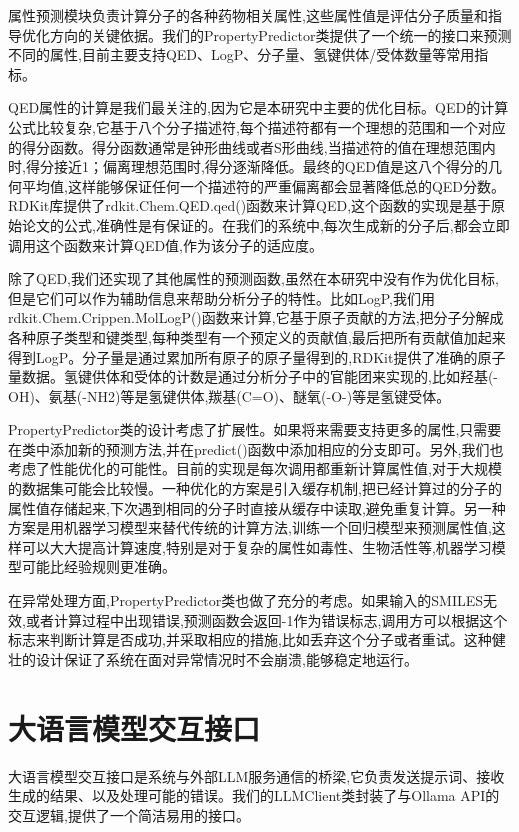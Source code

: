 属性预测模块负责计算分子的各种药物相关属性,这些属性值是评估分子质量和指导优化方向的关键依据。我们的PropertyPredictor类提供了一个统一的接口来预测不同的属性,目前主要支持QED、LogP、分子量、氢键供体/受体数量等常用指标。

QED属性的计算是我们最关注的,因为它是本研究中主要的优化目标。QED的计算公式比较复杂,它基于八个分子描述符,每个描述符都有一个理想的范围和一个对应的得分函数。得分函数通常是钟形曲线或者S形曲线,当描述符的值在理想范围内时,得分接近1；偏离理想范围时,得分逐渐降低。最终的QED值是这八个得分的几何平均值,这样能够保证任何一个描述符的严重偏离都会显著降低总的QED分数。RDKit库提供了rdkit.Chem.QED.qed()函数来计算QED,这个函数的实现是基于原始论文的公式,准确性是有保证的。在我们的系统中,每次生成新的分子后,都会立即调用这个函数来计算QED值,作为该分子的适应度。

除了QED,我们还实现了其他属性的预测函数,虽然在本研究中没有作为优化目标,但是它们可以作为辅助信息来帮助分析分子的特性。比如LogP,我们用rdkit.Chem.Crippen.MolLogP()函数来计算,它基于原子贡献的方法,把分子分解成各种原子类型和键类型,每种类型有一个预定义的贡献值,最后把所有贡献值加起来得到LogP。分子量是通过累加所有原子的原子量得到的,RDKit提供了准确的原子量数据。氢键供体和受体的计数是通过分析分子中的官能团来实现的,比如羟基(-OH)、氨基(-NH2)等是氢键供体,羰基(C=O)、醚氧(-O-)等是氢键受体。

PropertyPredictor类的设计考虑了扩展性。如果将来需要支持更多的属性,只需要在类中添加新的预测方法,并在predict()函数中添加相应的分支即可。另外,我们也考虑了性能优化的可能性。目前的实现是每次调用都重新计算属性值,对于大规模的数据集可能会比较慢。一种优化的方案是引入缓存机制,把已经计算过的分子的属性值存储起来,下次遇到相同的分子时直接从缓存中读取,避免重复计算。另一种方案是用机器学习模型来替代传统的计算方法,训练一个回归模型来预测属性值,这样可以大大提高计算速度,特别是对于复杂的属性如毒性、生物活性等,机器学习模型可能比经验规则更准确。

在异常处理方面,PropertyPredictor类也做了充分的考虑。如果输入的SMILES无效,或者计算过程中出现错误,预测函数会返回-1作为错误标志,调用方可以根据这个标志来判断计算是否成功,并采取相应的措施,比如丢弃这个分子或者重试。这种健壮的设计保证了系统在面对异常情况时不会崩溃,能够稳定地运行。

\section{大语言模型交互接口}

大语言模型交互接口是系统与外部LLM服务通信的桥梁,它负责发送提示词、接收生成的结果、以及处理可能的错误。我们的LLMClient类封装了与Ollama API的交互逻辑,提供了一个简洁易用的接口。


